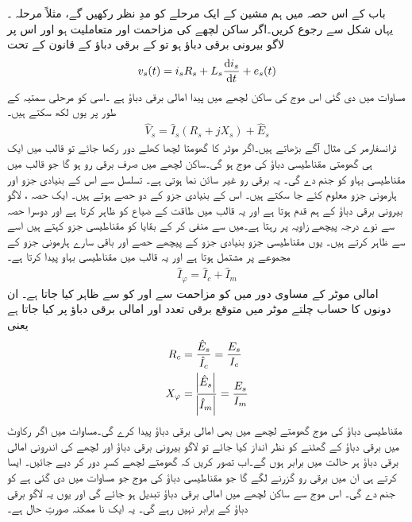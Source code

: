 باب کے اس حصہ میں ہم مشین کے ایک مرحلے کو مدِ نظر رکھیں گے، مثلاً مرحلہ  ۔ یہاں شکل   سے رجوع کریں۔اگر ساکن لچھے کی مزاحمت  اور متعاملیت  ہو اور اس پر لاگو بیرونی برقی دباؤ  ہو تو  کے برقی دباؤ کے قانون کے تحت
\begin{align}
v_s(t)=i_s R_s +L_s \frac{\dif i_s}{\dif t}+e_s(t)
\end{align}
 مساوات   میں دی گئی اس موج کی ساکن لچھے میں پیدا امالی برقی دباؤ ہے ۔اسی کو مرحلی سمتیہ کے طور پر یوں لکھ سکتے ہیں۔
\begin{align}\label{مساوات_امالی_دوری_موٹر_مساوات}
\hat{V}_s=\hat{I}_s \left(R_s+j X_s \right)+\hat{E}_s
\end{align}
ٹرانسفارمر کی مثال آگے بڑھاتے ہیں۔اگر موٹر کا گھومتا لچھا کھلے دور رکھا جائے تو قالب میں ایک ہی گھومتی مقناطیسی دباؤ کی موج  ہو گی۔ساکن لچھے میں صرف برقی رو  ہو گا جو قالب میں مقناطیسی بہاو  کو جنم دے گی۔ یہ برقی رو  غیر سائن نما ہوتی ہے۔  تسلسل سے اس کے بنیادی جزو اور ہارمونی جزو معلوم کئے جا سکتے ہیں۔ اس کے بنیادی جزو کے دو حصے ہوتے ہیں۔ ایک حصہ  ، لاگو بیرونی برقی دباؤ  کے ہم قدم ہوتا ہے اور یہ قالب میں طاقت کے ضیاع کو ظاہر کرتا ہے اور دوسرا حصہ  سے نوے درجہ پیچھے زاویہ پر رہتا ہے۔میں سے  منفی کر کے بقایا کو مقناطیسی جزو کہتے ہیں اسے  سے ظاہر کرتے ہیں۔ یوں مقناطیسی جزو بنیادی جزو کے پیچھے حصے اور باقی سارے ہارمونی جزو کے مجموعے پر مشتمل ہوتا ہے اور یہ قالب میں مقناطیسی بہاو  پیدا کرتا ہے۔
\begin{align}
\hat{I}_\varphi=\hat{I}_c+\hat{I}_m
\end{align}
 امالی موٹر کے مساوی دور میں  کو مزاحمت  سے اور  کو  سے ظاہر کیا جاتا ہے۔ ان دونوں کا حساب چلتے موٹر میں متوقع برقی تعدد  اور امالی برقی دباؤ  پر کیا جاتا ہے یعنی
\begin{gather}
\begin{aligned}
R_c&=\frac{\hat{E}_s}{\hat{I}_c}=\frac{E_s}{I_c}\\
X_\varphi&=\frac{\abs{\hat{E}_s}}{\abs{\hat{I}_m}}=\frac{E_s}{I_m}
\end{aligned}
\end{gather}
مقناطیسی دباؤ کی موج  گھومتے لچھے میں بھی امالی برقی دباؤ پیدا کرے گی۔مساوات   میں اگر رکاوٹ میں برقی دباؤ کے گھٹنے کو نظر انداز کیا جائے تو لاگو بیرونی برقی دباؤ اور لچھے کی اندرونی امالی برقی دباؤ ہر حالت میں برابر ہوں گے۔اب تصور کریں کہ گھومتے لچھے کسرِ دور کر دیے جائیں۔ ایسا کرتے ہی ان میں برقی رو گزرنے لگے گا جو مقناطیسی دباؤ کی موج   جو مساوات   میں دی گئی ہے کو جنم دے گی۔ اس موج سے ساکن لچھے میں امالی برقی دباؤ  تبدیل ہو جائے گی اور یوں یہ لاگو برقی دباؤ کے برابر نہیں رہے گی۔ یہ ایک نا ممکنہ صورتِ حال ہے۔

